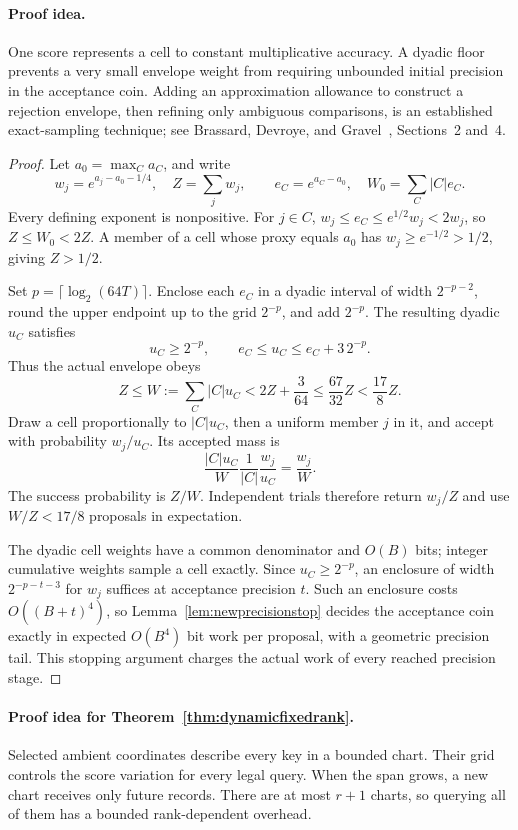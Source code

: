 \paragraph{Proof idea.}
One score represents a cell to constant multiplicative accuracy.
A dyadic floor prevents a very small envelope weight from
requiring unbounded initial precision in the acceptance coin.
Adding an approximation allowance to construct a rejection
envelope, then refining only ambiguous comparisons, is an
established exact-sampling technique; see Brassard, Devroye,
and Gravel~\cite{brassard2019remote}, Sections~2 and~4.

\begin{proof}
Let $a_0=\max_C a_C$, and write
\[
 w_j=e^{a_j-a_0-1/4},\quad Z=\sum_jw_j,\qquad
 e_C=e^{a_C-a_0},\quad W_0=\sum_C|C|e_C.
\]
Every defining exponent is nonpositive.  For $j\in C$,
$w_j\le e_C\le e^{1/2}w_j<2w_j$, so $Z\le W_0<2Z$.
A member of a cell whose proxy equals $a_0$ has
$w_j\ge e^{-1/2}>1/2$, giving $Z>1/2$.

Set $p=\lceil\log_2(64T)\rceil$.  Enclose each $e_C$ in a
dyadic interval of width $2^{-p-2}$, round the upper endpoint
up to the grid $2^{-p}$, and add $2^{-p}$.  The resulting
dyadic $u_C$ satisfies
\[
 u_C\ge2^{-p},\qquad e_C\le u_C\le e_C+3\,2^{-p}.
\]
Thus the actual envelope obeys
\[
 Z\le W:=\sum_C|C|u_C
 <2Z+\frac3{64}
 \le\frac{67}{32}Z<\frac{17}{8}Z.
\]
Draw a cell proportionally to $|C|u_C$, then a uniform member
$j$ in it, and accept with probability $w_j/u_C$.  Its accepted
mass is
\[
 \frac{|C|u_C}{W}\frac1{|C|}\frac{w_j}{u_C}
 =\frac{w_j}{W}.
\]
The success probability is $Z/W$.  Independent trials therefore
return $w_j/Z$ and use $W/Z<17/8$ proposals in expectation.

The dyadic cell weights have a common denominator and $O(B)$
bits; integer cumulative weights sample a cell exactly.  Since
$u_C\ge2^{-p}$, an enclosure of width $2^{-p-t-3}$ for $w_j$
suffices at acceptance precision $t$.  Such an enclosure costs
$O((B+t)^4)$, so
Lemma~\ref{lem:newprecisionstop} decides the acceptance coin exactly
in expected $O(B^4)$ bit work per proposal, with a geometric
precision tail.  This stopping argument charges the
actual work of every reached precision stage.
\end{proof}

\paragraph{Proof idea for Theorem~\ref{thm:dynamicfixedrank}.}
Selected ambient coordinates describe every key in a bounded
chart.  Their grid controls the score variation for every legal
query.  When the span grows, a new chart receives only future
records.  There are at most $r+1$ charts, so querying all of them
has a bounded rank-dependent overhead.

